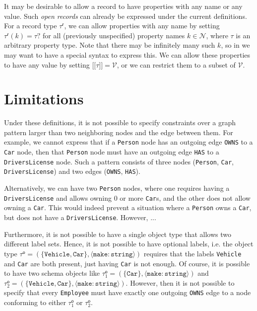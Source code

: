 \documentclass[a4paper]{article}
\newcommand{\ptype}{\tau}
\newcommand{\rtype}{\tau^\mathsf{r}}
\newcommand{\otype}{\tau^\mathsf{o}}
\newcommand{\lsem}{\ensuremath{[\![}}
\newcommand{\rsem}{\ensuremath{]\!]}}
\newcommand{\sem}[1]{\ensuremath{\lsem #1 \rsem}}
\begin{document}
It may be desirable to allow a record to have properties with any name or any value. Such \emph{open records} can already be expressed under the current definitions. For a record type $\rtype$, we can allow properties with any name by setting $\rtype(k) = \ptype?$ for all (previously unspecified) property names $k \in \mathcal{N}$, where $\ptype$ is an arbitrary property type. Note that there may be infinitely many such $k$, so in we may want to have a special syntax to express this. We can allow these properties to have any value by setting $\sem{\ptype} = \mathcal{V}$, or we can restrict them to a subset of $\mathcal{V}$.

\section{Limitations}

Under these definitions, it is not possible to specify constraints over a graph pattern larger than two neighboring nodes and the edge between them. For example, we cannot express that if a \texttt{Person} node has an outgoing edge \texttt{OWNS} to a \texttt{Car} node, then that \texttt{Person} node must have an outgoing edge \texttt{HAS} to a \texttt{DriversLicense} node. Such a pattern consists of three nodes (\texttt{Person}, \texttt{Car}, \texttt{DriversLicense}) and two edges (\texttt{OWNS}, \texttt{HAS}).

Alternatively, we can have two \texttt{Person} nodes, where one requires having a \texttt{DriversLicense} and allows owning 0 or more \texttt{Car}s, and the other does not allow owning a \texttt{Car}. This would indeed prevent a situation where a \texttt{Person} owns a \texttt{Car}, but does not have a \texttt{DriversLicense}. However, ...



Furthermore, it is not possible to have a single object type that allows two different label sets. Hence, it is not possible to have optional labels, i.e. the object type $\otype = (\{\texttt{Vehicle}, \texttt{Car}\}, \langle \texttt{make} : \texttt{string} \rangle)$ requires that the labels \texttt{Vehicle} and \texttt{Car} are both present, just having \texttt{Car} is not enough. Of course, it is possible to have two schema objects like $\otype_1 = (\{\texttt{Car}\}, \langle \texttt{make} : \texttt{string} \rangle)$ and $\otype_2 = (\{\texttt{Vehicle}, \texttt{Car}\}, \langle \texttt{make} : \texttt{string} \rangle)$. However, then it is not possible to specify that every \texttt{Employee} must have exactly one outgoing \texttt{OWNS} edge to a node conforming to either $\otype_1$ or $\otype_2$.

\end{document}
